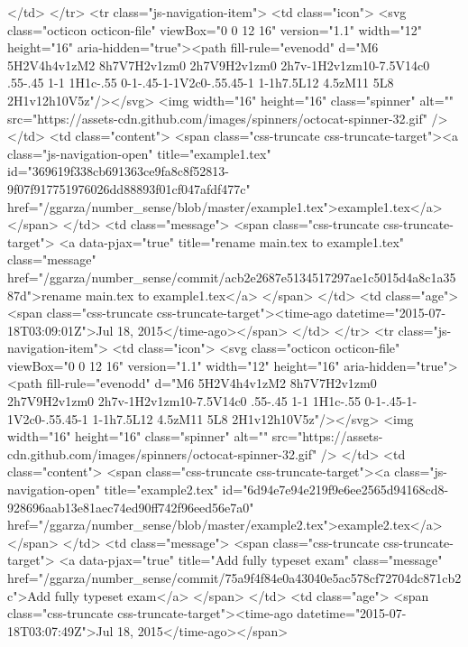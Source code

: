           </td>
        </tr>
        <tr class="js-navigation-item">
          <td class="icon">
            <svg class="octicon octicon-file" viewBox="0 0 12 16" version="1.1" width="12" height="16" aria-hidden="true"><path fill-rule="evenodd" d="M6 5H2V4h4v1zM2 8h7V7H2v1zm0 2h7V9H2v1zm0 2h7v-1H2v1zm10-7.5V14c0 .55-.45 1-1 1H1c-.55 0-1-.45-1-1V2c0-.55.45-1 1-1h7.5L12 4.5zM11 5L8 2H1v12h10V5z"/></svg>
            <img width="16" height="16" class="spinner" alt="" src="https://assets-cdn.github.com/images/spinners/octocat-spinner-32.gif" />
          </td>
          <td class="content">
            <span class="css-truncate css-truncate-target"><a class="js-navigation-open" title="example1.tex" id="369619f338cb691363ce9fa8c8f52813-9f07f917751976026dd88893f01cf047afdf477c" href="/ggarza/number_sense/blob/master/example1.tex">example1.tex</a></span>
          </td>
          <td class="message">
            <span class="css-truncate css-truncate-target">
                  <a data-pjax="true" title="rename main.tex to example1.tex" class="message" href="/ggarza/number_sense/commit/acb2e2687e5134517297ae1c5015d4a8c1a3587d">rename main.tex to example1.tex</a>
            </span>
          </td>
          <td class="age">
            <span class="css-truncate css-truncate-target"><time-ago datetime="2015-07-18T03:09:01Z">Jul 18, 2015</time-ago></span>
          </td>
        </tr>
        <tr class="js-navigation-item">
          <td class="icon">
            <svg class="octicon octicon-file" viewBox="0 0 12 16" version="1.1" width="12" height="16" aria-hidden="true"><path fill-rule="evenodd" d="M6 5H2V4h4v1zM2 8h7V7H2v1zm0 2h7V9H2v1zm0 2h7v-1H2v1zm10-7.5V14c0 .55-.45 1-1 1H1c-.55 0-1-.45-1-1V2c0-.55.45-1 1-1h7.5L12 4.5zM11 5L8 2H1v12h10V5z"/></svg>
            <img width="16" height="16" class="spinner" alt="" src="https://assets-cdn.github.com/images/spinners/octocat-spinner-32.gif" />
          </td>
          <td class="content">
            <span class="css-truncate css-truncate-target"><a class="js-navigation-open" title="example2.tex" id="6d94e7e94e219f9e6ee2565d94168cd8-928696aab13e81aec74ed90ff742f96eed56e7a0" href="/ggarza/number_sense/blob/master/example2.tex">example2.tex</a></span>
          </td>
          <td class="message">
            <span class="css-truncate css-truncate-target">
                  <a data-pjax="true" title="Add fully typeset exam" class="message" href="/ggarza/number_sense/commit/75a9f4f84e0a43040e5ac578cf72704dc871cb2c">Add fully typeset exam</a>
            </span>
          </td>
          <td class="age">
            <span class="css-truncate css-truncate-target"><time-ago datetime="2015-07-18T03:07:49Z">Jul 18, 2015</time-ago></span>
